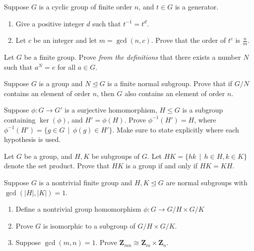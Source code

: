 \documentclass[11pt,twoside,openany]{memoir}
\begin{document}
        \begin{exercise}
            Suppose $G$ is a cyclic group of finite order $n$, and $t\in G$ is a generator.
            \begin{enumerate}[label = (\arabic*)]
                \item Give a positive integer $d$ such that $t^{-1}=t^d$.
                \item Let $c$ be an integer and let $m=\gcd(n,c)$. Prove that the order of $t^c$ is $\frac{n}{m}$.
            \end{enumerate}
            \end{exercise}
        
        \begin{exercise}
        Let $G$ be a finite group. Prove \textit{from the definitions} that there exists a number $N$ such that $a^N=e$ for all $a\in G$.
        \end{exercise}
        
        \begin{exercise}
        Suppose $G$ is a group and $N\unlhd G$ is a finite normal subgroup. Prove that if $G/N$ contains an element of order $n$, then $G$ also contains an element of order $n$.
        \end{exercise}
        
        \begin{exercise}
        Suppose $\phi:G\to G'$ is a surjective homomorphism, $H\le G$ is a subgroup containing $\ker(\phi)$, and $H'=\phi(H)$. Prove $\phi^{-1}(H')=H$, where $\phi^{-1}(H')=\{g\in G\,\mid\, \phi(g)\in H'\}$. Make sure to state explicitly where each hypothesis is used.
        \end{exercise}
        
        \begin{exercise}
        Let $G$ be a group, and $H, K$ be subgroups of $G$. Let $HK=\{hk\,\mid \, h\in H, k\in K\}$ denote the set product. Prove that $HK$ is a group if and only if $HK=KH$.
        \end{exercise}
        
        \begin{exercise}
        Suppose $G$ is a nontrivial finite group and $H,K\mathrel{\unlhd}G$ are normal subgroups with $\gcd(|H|,|K|)=1$.
        \begin{enumerate}[label = (\arabic*)]
            \item Define a nontrivial group homomorphism $\phi:G\to G/H\times G/K$
            \item Prove $G$ is isomorphic to a subgroup of $G/H\times G/K$.
            \item Suppose $\gcd(m,n)=1$. Prove $\mathbf{Z}_{mn}\cong \mathbf{Z}_m\times \mathbf{Z}_n$.
        \end{enumerate}
        \end{exercise}
        
\end{document}
